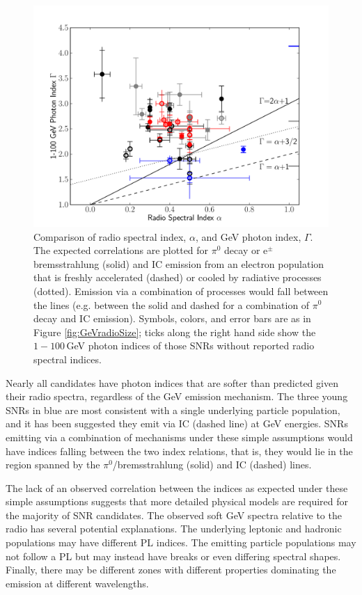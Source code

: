 \begin{figure}[h!]
	\centering
	\includegraphics[width=0.8\columnwidth]{figures/radio_vs_gamma_index.pdf}
	\caption[Comparison of radio spectral index, $\alpha$, and GeV photon index, $\Gamma$.]{Comparison of radio spectral index, $\alpha$, and GeV photon index, $\Gamma$. The expected correlations are plotted for $\pi^0$ decay or e$^{\pm}$ bremsstrahlung (solid) and IC emission from an electron population that is freshly accelerated (dashed) or cooled by radiative processes (dotted). Emission via a combination of processes would fall between the lines (e.g. between the solid and dashed for a combination of $\pi^0$ decay and IC emission).  Symbols, colors, and error bars are as in Figure \ref{fig:GeVradioSize}; ticks along the right hand side show the $1-100$\,GeV photon indices of those SNRs without reported radio spectral indices.
	}
	\label{fig:GeVradioIndex}
\end{figure}

Nearly all candidates have \gam{} photon indices that are softer than predicted given their radio spectra, regardless of the GeV emission mechanism. The three young SNRs in blue are most consistent with a single underlying particle population, and it has been suggested they emit via IC (dashed line) at GeV energies. SNRs emitting via a combination of mechanisms under these simple assumptions would have indices falling between the two index relations, that is, they would lie in the region spanned by the $\pi^0$/bremsstrahlung (solid) and IC (dashed) lines. 

The lack of an observed correlation between the indices as expected under these simple assumptions suggests that more detailed physical models are required for the majority of SNR candidates. The observed soft GeV spectra relative to the radio has several potential explanations. 
The underlying leptonic and hadronic populations may have different PL indices. The emitting particle populations may not follow a PL but may instead have breaks or even differing spectral shapes. Finally, there may be different zones with different properties dominating the emission at different wavelengths.

